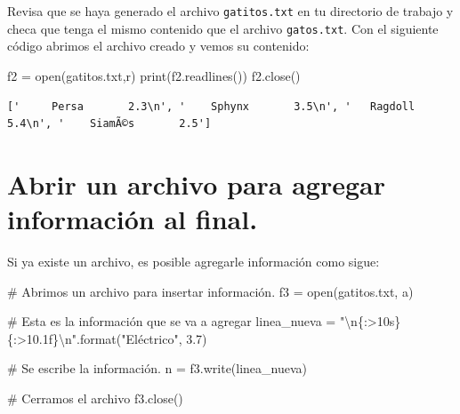 \documentclass[
  spanish,
  letterpaper,
]{scrbook}
\newenvironment{Shaded}{\begin{snugshade}}{\end{snugshade}}
\newcommand{\BuiltInTok}[1]{\textcolor[rgb]{0.00,0.23,0.31}{#1}}
\newcommand{\CharTok}[1]{\textcolor[rgb]{0.13,0.47,0.30}{#1}}
\newcommand{\CommentTok}[1]{\textcolor[rgb]{0.37,0.37,0.37}{#1}}
\newcommand{\FloatTok}[1]{\textcolor[rgb]{0.68,0.00,0.00}{#1}}
\newcommand{\NormalTok}[1]{\textcolor[rgb]{0.00,0.23,0.31}{#1}}
\newcommand{\OperatorTok}[1]{\textcolor[rgb]{0.37,0.37,0.37}{#1}}
\newcommand{\SpecialCharTok}[1]{\textcolor[rgb]{0.37,0.37,0.37}{#1}}
\newcommand{\StringTok}[1]{\textcolor[rgb]{0.13,0.47,0.30}{#1}}
\theoremstyle{definition}
\theoremstyle{remark}
\begin{document}
Revisa que se haya generado el archivo \texttt{gatitos.txt} en tu
directorio de trabajo y checa que tenga el mismo contenido que el
archivo \texttt{gatos.txt}. Con el siguiente código abrimos el archivo
creado y vemos su contenido:

\begin{Shaded}
\begin{Highlighting}[]
\NormalTok{f2 }\OperatorTok{=} \BuiltInTok{open}\NormalTok{(}\StringTok{\textquotesingle{}gatitos.txt\textquotesingle{}}\NormalTok{,}\StringTok{\textquotesingle{}r\textquotesingle{}}\NormalTok{)}
\BuiltInTok{print}\NormalTok{(f2.readlines())}
\NormalTok{f2.close()}
\end{Highlighting}
\end{Shaded}

\begin{verbatim}
['     Persa       2.3\n', '    Sphynx       3.5\n', '   Ragdoll       5.4\n', '    SiamÃ©s       2.5']
\end{verbatim}

\section{Abrir un archivo para agregar información al
final.}\label{abrir-un-archivo-para-agregar-informaciuxf3n-al-final.}

Si ya existe un archivo, es posible agregarle información como sigue:

\begin{Shaded}
\begin{Highlighting}[]
\CommentTok{\# Abrimos un archivo para insertar información.}
\NormalTok{f3 }\OperatorTok{=} \BuiltInTok{open}\NormalTok{(}\StringTok{\textquotesingle{}gatitos.txt\textquotesingle{}}\NormalTok{, }\StringTok{\textquotesingle{}a\textquotesingle{}}\NormalTok{)}

\CommentTok{\# Esta es la información que se va a agregar}
\NormalTok{linea\_nueva }\OperatorTok{=} \StringTok{"}\CharTok{\textbackslash{}n}\SpecialCharTok{\{:\textgreater{}10s\}\{:\textgreater{}10.1f\}}\CharTok{\textbackslash{}n}\StringTok{"}\NormalTok{.}\BuiltInTok{format}\NormalTok{(}\StringTok{"Eléctrico"}\NormalTok{, }\FloatTok{3.7}\NormalTok{)}

\CommentTok{\# Se escribe la información.}
\NormalTok{n }\OperatorTok{=}\NormalTok{ f3.write(linea\_nueva)}

\CommentTok{\# Cerramos el archivo}
\NormalTok{f3.close()}
\end{Highlighting}
\end{Shaded}
\end{document}
